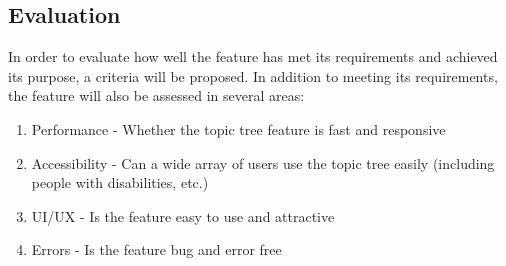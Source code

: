 \subsection{Evaluation}
In order to evaluate how well the feature has met its requirements and achieved its purpose, a criteria will be proposed. In addition to meeting its requirements, the feature will also be assessed in several areas:
\begin{enumerate}
    \item Performance - Whether the topic tree feature is fast and responsive
    \item Accessibility - Can a wide array of users use the topic tree easily (including people with disabilities, etc.)
    \item UI/UX - Is the feature easy to use and attractive
    \item Errors - Is the feature bug and error free
\end{enumerate}